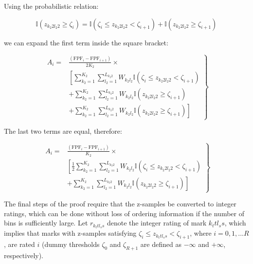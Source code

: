 \documentclass[
]{book}
\begin{document}
Using the probabilistic relation:

\begin{equation}
\mathbb{I}\left ( z_{k_2 2 l_2 2} \geq \zeta_i \right ) = \mathbb{I}\left ( \zeta_{i} \leq z_{k_2 2 l_2 2} < \zeta_{i+1} \right ) + \mathbb{I}\left ( z_{k_2 2 l_2 2} \geq \zeta_{i+1} \right )
\label{eq:empirical-appendix-1}
\end{equation}

we can expand the first term inside the square bracket:

\begin{equation}
\left. 
\begin{aligned}
A_i =&  \frac{\left (\text{FPF}_i - \text{FPF}_{i+1}\right )}{2K_2} \times \\ 
& \left[ \sum_{k_2=1}^{K_2}\sum_{l_2=1}^{L_{k_2 2}}W_{k_2 l_2} \mathbb{I}\left ( \zeta_{i} \leq z_{k_2 2 l_2 2} < \zeta_{i+1} \right ) \right. \\
&+ \sum_{k_2=1}^{K_2}\sum_{l_2=1}^{L_{k_2 2}}W_{k_2 l_2} \mathbb{I}\left ( z_{k_2 2 l_2 2} \geq \zeta_{i+1} \right ) \\ 
&+ \left. \sum_{k_2=1}^{K_2}\sum_{l_2=1}^{L_{k_2 2}}W_{k_2 l_2} \mathbb{I}\left ( z_{k_2 2 l_2 2} \geq \zeta_{i+1} \right ) \right]  
\end{aligned}
\right \} 
\end{equation}

The last two terms are equal, therefore:

\begin{equation}
\left. 
\begin{aligned}
A_i =& \frac{\left (\text{FPF}_i - \text{FPF}_{i+1}\right )}{K_2} \times \\ 
& \left[ \frac{1}{2} \sum_{k_2=1}^{K_2}\sum_{l_2=1}^{L_{k_2 2}}W_{k_2 l_2} \mathbb{I}\left ( \zeta_{i} \leq z_{k_2 2 l_2 2} < \zeta_{i+1} \right ) \right. \\
& +\left. \sum_{k_2=1}^{K_2}\sum_{l_2=1}^{L_{k_2 2}}W_{k_2 l_2} \mathbb{I}\left ( z_{k_2 2 l_2 2} \geq \zeta_{i+1} \right ) \right]  
\end{aligned}
\right \} 
\label{eq:empirical-theorem3}
\end{equation}

The final steps of the proof require that the z-samples be converted to integer ratings, which can be done without loss of ordering information if the number of bins is sufficiently large. Let \(r_{k_t t l_s s}\) denote the integer rating of mark \(k_t tl_s s\), which implies that marks with z-samples satisfying \(\zeta_i \leq z_{k_t tl_s s} < \zeta_{i+1}\), where \(i=0,1,...R\), are rated \(i\) (dummy thresholds \(\zeta_0\) and \(\zeta_{R+1}\) are defined as \(-\infty\) and \(+\infty\), respectively).
\end{document}
